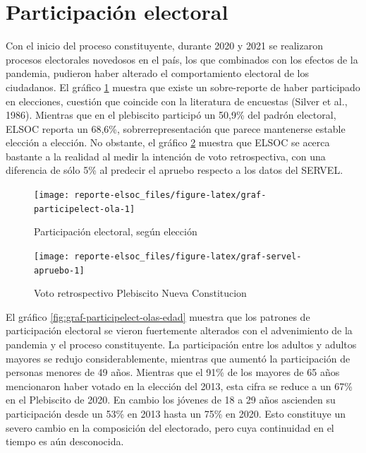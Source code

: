 \documentclass[
  12pt,
]{book}
\begin{document}
\hypertarget{participaciuxf3n-electoral}{%
\section{Participación electoral}\label{participaciuxf3n-electoral}}

Con el inicio del proceso constituyente, durante 2020 y 2021 se realizaron procesos electorales novedosos en el país, los que combinados con los efectos de la pandemia, pudieron haber alterado el comportamiento electoral de los ciudadanos. El gráfico \ref{fig:graf-participelect-ola} muestra que existe un sobre-reporte de haber participado en elecciones, cuestión que coincide con la literatura de encuestas (Silver et al., 1986). Mientras que en el plebiscito participó un 50,9\% del padrón electoral, ELSOC reporta un 68,6\%, sobrerrepresentación que parece mantenerse estable elección a elección. No obstante, el gráfico \ref{fig:graf-servel-apruebo} muestra que ELSOC se acerca bastante a la realidad al medir la intención de voto retrospectiva, con una diferencia de sólo 5\% al predecir el apruebo respecto a los datos del SERVEL.

\begin{figure}

{\centering \texttt{[image: reporte-elsoc\_files/figure-latex/graf-participelect-ola-1]} 

}

\caption{Participación electoral, según elección}\label{fig:graf-participelect-ola}
\end{figure}

\begin{figure}

{\centering \texttt{[image: reporte-elsoc\_files/figure-latex/graf-servel-apruebo-1]} 

}

\caption{Voto retrospectivo Plebiscito Nueva Constitucion}\label{fig:graf-servel-apruebo}
\end{figure}

El gráfico \ref{fig:graf-participelect-olas-edad} muestra que los patrones de participación electoral se vieron fuertemente alterados con el advenimiento de la pandemia y el proceso constituyente. La participación entre los adultos y adultos mayores se redujo considerablemente, mientras que aumentó la participación de personas menores de 49 años. Mientras que el 91\% de los mayores de 65 años mencionaron haber votado en la elección del 2013, esta cifra se reduce a un 67\% en el Plebiscito de 2020. En cambio los jóvenes de 18 a 29 años ascienden su participación desde un 53\% en 2013 hasta un 75\% en 2020. Esto constituye un severo cambio en la composición del electorado, pero cuya continuidad en el tiempo es aún desconocida.
\end{document}

